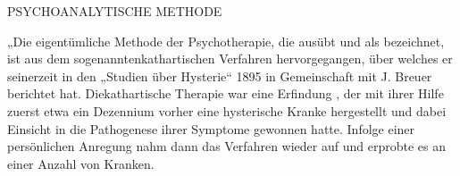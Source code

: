 \documentclass[twoside=true,titlepage=false,open=any, parskip=never, fontsize=10pt, headings=small, chapterprefix=false, appendixprefix=false]{scrbook}
\begin{document}
        \beforeeledchapter
    
            
            
            
        
               
                   PSYCHOANALYTISCHE METHODE
               
            
        \pend
        \beforeeledchapter
    
            
        \pstart
        „Die eigentümliche Methode der Psychotherapie, die  ausübt und als  bezeichnet, ist aus dem sogenanntenkathartischen Verfahren hervorgegangen,
               über welches er seinerzeit in den „Studien über Hysterie“ 1895 in
               Gemeinschaft mit
               J. Breuer berichtet
               hat. Diekathartische
                  Therapie war eine Erfindung , der mit ihrer Hilfe zuerst etwa ein Dezennium vorher
               eine hysterische Kranke hergestellt und dabei Einsicht in die Pathogenese ihrer Symptome gewonnen
               hatte. Infolge einer persönlichen Anregung  nahm dann  das Verfahren
               wieder auf und erprobte es an einer  Anzahl von Kranken.
        \pend
    
\end{document}
